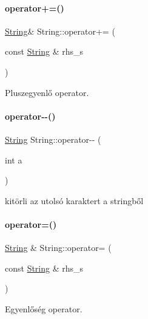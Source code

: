 \mbox{\label{class_string_ac203e7c52e04bb86f62f9dd75527b361}} 
\paragraph{\texorpdfstring{operator+=()}{operator+=()}}
{\footnotesize\ttfamily \mbox{\hyperlink{class_string}{String}}\& String\+::operator+= (\begin{DoxyParamCaption}\item[{const \mbox{\hyperlink{class_string}{String}} \&}]{rhs\+\_\+s }\end{DoxyParamCaption})\hspace{0.3cm}{\ttfamily [inline]}}



Pluszegyenlő operator. 

\mbox{\label{class_string_a79869b69dd0106b1b6d179f760d6527a}} 
\paragraph{\texorpdfstring{operator-\/-\/()}{operator--()}}
{\footnotesize\ttfamily \mbox{\hyperlink{class_string}{String}} String\+::operator-\/-\/ (\begin{DoxyParamCaption}\item[{int}]{a }\end{DoxyParamCaption})}



kitörli az utolsó karaktert a stringből 

\mbox{\label{class_string_a803e6112834d4c0cdb0da6c6a4000e6e}} 
\paragraph{\texorpdfstring{operator=()}{operator=()}}
{\footnotesize\ttfamily \mbox{\hyperlink{class_string}{String}} \& String\+::operator= (\begin{DoxyParamCaption}\item[{const \mbox{\hyperlink{class_string}{String}} \&}]{rhs\+\_\+s }\end{DoxyParamCaption})}



Egyenlőség operator. 


